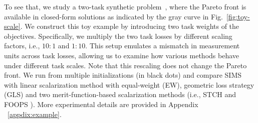 \documentclass[sigconf]{acmart}
\begin{document}


To see that, we study a two-task synthetic problem~\cite{navon2022multi}, where the Pareto front is available in closed-form solutions as indicated by the gray curve in Fig.~\ref{fig:toy-scale}. 
We construct this toy example by introducing two task weights of the objectives.
Specifically, we multiply the two task losses by different scaling factors, i.e., $10:1$ and $1:10$. This setup emulates a mismatch in measurement units across task losses, allowing us to examine how various methods behave under different task scales. %
Note that this rescaling does not change the Pareto front. 
We run from multiple initializations (in black dots) and compare SIMS with linear scalarization method with equal-weight (EW), geometric loss strategy (GLS) \cite{chennupati2019multinet++} and two merit-function-based scalarization methods (i.e., STCH \cite{lin2024smooth} and FOOPS \cite{chen2025efficient}). More experimental details are provided in Appendix ~\ref{appdix:example}.
\end{document}
